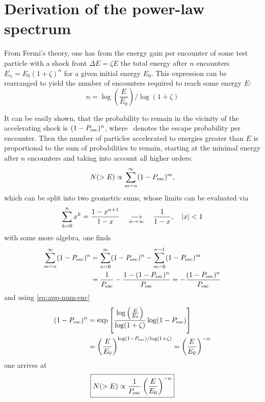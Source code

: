 \section{Derivation of the power-law spectrum}
\label{sec:app1}
From Fermi's theory, one has from the energy gain per encounter of some test
particle with a shock front $\Delta{E}=\zeta{E}$ the total energy after $n$
encounters $E_n=E_0(1+\zeta)^n$ for a given initial energy $E_0$. This
expression can be rearranged to yield the number of encounters required to
reach some energy $E$:
\begin{equation}
    n={\log\left(\frac{E}{E_0}\right)}/{\log(1+\zeta)}
    \label{eq:app-num-enc}
\end{equation}

It can be easily shown, that the probability to remain in the
vicinity of the accelerating shock is $(1-P_{\mathrm{esc}})^n$, where \Pesc~denotes the
escape probability per encounter.
Then the number of particles accelerated to energies greater than $E$ is
proportional to the sum of probabilities to remain, starting at the minimal
energy after $n$ encounters and taking into account all higher orders:
\begin{equation}
    N(>E)\propto\sum_{m=n}^{\infty}(1-P_{\mathrm{esc}})^m,
    \label{eq:NgreaterE}
\end{equation}
which can be split into two geometric sums, whose limits can be evaluated via
\begin{gather*}
    \sum_{k=0}^{n}x^k=\frac{1-x^{n+1}}{1-x}
    \quad\underset{n\to\infty}{\longrightarrow}\quad
    \frac{1}{1-x}\qc\abs{x}<1
\end{gather*}
with some more algebra, one finds
\begin{align*}
    \sum_{m=n}^{\infty}(1-P_{\mathrm{esc}})^n
    &=\sum_{n=0}^{\infty}(1-P_{\mathrm{esc}})^n-\sum_{m=0}^{n-1}(1-P_{\mathrm{esc}})^m \\
    &=\frac{1}{P_{\mathrm{esc}}}-\frac{1-(1-P_{\mathrm{esc}})^n}{P_{\mathrm{esc}}}
    =-\frac{(1-P_{\mathrm{esc}})^n}{P_{\mathrm{esc}}}
\end{align*}
and using \cref{eq:app-num-enc}
\begin{align*}
    (1-P_{\mathrm{esc}})^n
    &=\exp\left[\frac{\log\left(\frac{E}{E_0}\right)}{\log(1+\zeta)}\log(1-P_{\mathrm{esc}})\right]\\
    &=\left(\frac{E}{E_0}\right)^{{\log(1-P_{\mathrm{esc}})}/{\log(1+\zeta)}}
    =\left(\frac{E}{E_0}\right)^{-\alpha}
\end{align*}
one arrives at
\begin{equation}
    \boxed{%
        N(>E)\propto\frac{1}{\Pesc}\left(\frac{E}{E_0}\right)^{-\alpha}}
\end{equation}
